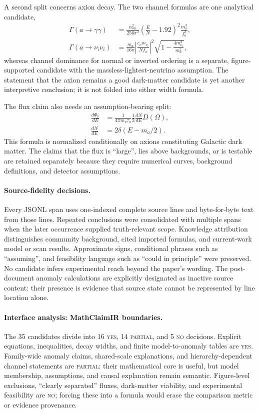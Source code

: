 A second split concerns axion decay. The two channel formulas are one
analytical candidate,
\[
\begin{aligned}
 \Gamma(a\to\gamma\gamma)
 &=\frac{\alpha_{\mathrm{em}}^2}{256\pi^3}
 \left(\frac EN-1.92\right)^2\frac{m_a^3}{f_a^2},\\
 \Gamma(a\to\nu_i\nu_i)
 &=\frac{m_a}{16\pi}
 \left|\frac{c_\nu m_{\nu_i}}{Nf_a}\right|^2
 \sqrt{1-\frac{4m_{\nu_i}^2}{m_a^2}},
\end{aligned}
\]
whereas channel dominance for normal or inverted ordering is a separate,
figure-supported candidate with the massless-lightest-neutrino assumption.
The statement that the axion remains a good dark-matter candidate is yet
another interpretive conclusion; it is not folded into either width formula.

The flux claim also needs an assumption-bearing split:
\[
\begin{aligned}
 \frac{d\Phi_\nu}{dE}
 &=\frac{1}{4\pi m_a\tau_a}\frac13\frac{dN}{dE}D(\Omega),\\
 \frac{dN}{dE}&=2\delta(E-m_a/2).
\end{aligned}
\]
This formula is normalized conditionally on axions constituting Galactic dark
matter. The claims that the flux is ``large'', lies above backgrounds, or is
testable are retained separately because they require numerical curves,
background definitions, and detector assumptions.

\paragraph{Source-fidelity decisions.}
Every JSONL span uses one-indexed complete source lines and byte-for-byte text
from those lines. Repeated conclusions were consolidated with multiple spans
when the later occurrence supplied truth-relevant scope. Knowledge
attribution distinguishes community background, cited imported formulas, and
current-work model or scan results. Approximate signs, conditional phrases
such as ``assuming'', and feasibility language such as ``could in principle''
were preserved. No candidate infers experimental reach beyond the paper's
wording. The post-document anomaly calculations are explicitly designated as
inactive source content: their presence is evidence that source state cannot
be represented by line location alone.

\paragraph{Interface analysis: MathClaimIR boundaries.}
The 35 candidates divide into 16 \textsc{yes}, 14 \textsc{partial}, and 5
\textsc{no} decisions. Explicit equations, inequalities, decay widths, and
finite model-to-anomaly tables are \textsc{yes}. Family-wide anomaly claims,
shared-scale explanations, and hierarchy-dependent channel statements are
\textsc{partial}: their mathematical core is useful, but model membership,
assumptions, and causal explanation remain semantic. Figure-level exclusions,
``clearly separated'' fluxes, dark-matter viability, and experimental
feasibility are \textsc{no}; forcing these into a formula would erase the
comparison metric or evidence provenance.

